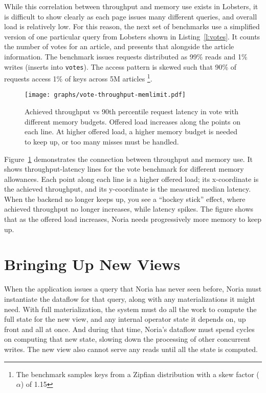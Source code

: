 While this correlation between throughput and memory use exists in Lobsters, it
is difficult to show clearly as each page issues many different queries, and
overall load is relatively low. For this reason, the next set of benchmarks use
a simplified version of one particular query from Lobsters shown in
Listing~\ref{l:votes}. It counts the number of votes for an article, and
presents that alongside the article information. The benchmark issues requests
distributed as 99\% reads and 1\% writes (inserts into \texttt{votes}). The
access pattern is skewed such that 90\% of requests access 1\% of keys across 5M
articles%
\footnote{The benchmark samples keys from a Zipfian distribution with a skew
factor ($\alpha$) of 1.15}.

\begin{figure}[h]
  \centering
  \texttt{[image: graphs/vote-throughput-memlimit.pdf]}
  \caption{Achieved throughput vs 90th percentile request latency in vote with
  different memory budgets. Offered load increases along the points on each
  line. At higher offered load, a higher memory budget is needed to keep up, or
  too many misses must be handled.}
  \label{f:vote-throughput-memlimit}
\end{figure}

Figure~\ref{f:vote-throughput-memlimit} demonstrates the connection between
throughput and memory use. It shows throughput-latency lines for the vote
benchmark for different memory allowances. Each point along each line is a
higher offered load; its x-coordinate is the achieved throughput, and its
y-coordinate is the measured median latency. When the backend no longer keeps
up, you see a ``hockey stick'' effect, where achieved throughput no longer
increases, while latency spikes. The figure shows that as the offered load
increases, Noria needs progressively more memory to keep up.

\section{Bringing Up New Views}
\label{s:eval:mig}

When the application issues a query that Noria has never seen before, Noria must
instantiate the dataflow for that query, along with any materializations it
might need. With full materialization, the system must do all the work to
compute the full state for the new view, and any internal operator state it
depends on, up front and all at once. And during that time, Noria's dataflow
must spend cycles on computing that new state, slowing down the processing of
other concurrent writes. The new view also cannot serve any reads until all the
state is computed.

